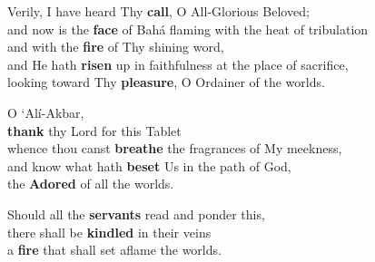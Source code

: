 \documentclass[14pt]{extarticle}
\begin{document}
\begin{hafez}{}{}
  \mbox{}

  Verily, I have heard Thy \textbf{call}, O All-Glorious Beloved; \\
  and now is the \textbf{face} of Bahá flaming with the heat of tribulation \\
  and with the \textbf{fire} of Thy shining word, \\
  and He hath \textbf{risen} up in faithfulness at the place of sacrifice, \\
  looking toward Thy \textbf{pleasure}, O Ordainer of the worlds.

  O `Alí-Akbar, \\
  \textbf{thank} thy Lord for this Tablet \\
  whence thou canst \textbf{breathe} the fragrances of My meekness, \\
  and know what hath \textbf{beset} Us in the path of God, \\
  the \textbf{Adored} of all the worlds.

  Should all the \textbf{servants} read and ponder this, \\
  there shall be \textbf{kindled} in their veins \\
  a \textbf{fire} that shall set aflame the worlds.
\end{hafez}

\newpage
\end{document}
